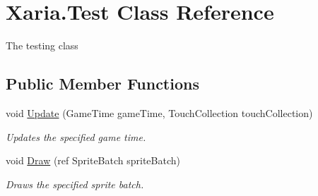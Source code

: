\hypertarget{classXaria_1_1Test}{}\section{Xaria.\+Test Class Reference}
\label{classXaria_1_1Test}


The testing class  


\subsection*{Public Member Functions}
\begin{DoxyCompactItemize}
\item 
void \hyperlink{classXaria_1_1Test_af6298f90365209347b5bd4581ff7761d}{Update} (Game\+Time game\+Time, Touch\+Collection touch\+Collection)
\begin{DoxyCompactList}\small\item\em Updates the specified game time. \end{DoxyCompactList}\item 
void \hyperlink{classXaria_1_1Test_a0c23a1aea214e972d3f48f2542343036}{Draw} (ref Sprite\+Batch sprite\+Batch)
\begin{DoxyCompactList}\small\item\em Draws the specified sprite batch. \end{DoxyCompactList}\end{DoxyCompactItemize}
